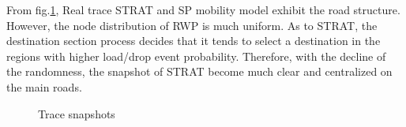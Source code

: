 From fig.\ref{figure_trace_snapshots}, Real trace STRAT and SP mobility model exhibit the road structure. However, the node distribution of RWP is much uniform.
As to STRAT, the destination section process decides that it tends to select a destination in the regions with higher load/drop event probability.
Therefore, with the decline of the randomness, the snapshot of STRAT become much clear and centralized on the main roads.
\begin{figure}[!h]
\centering
{}
\vspace{0.in}
\hspace{0.0in}
\vspace{0.in}
\hspace{0.0in}
\vspace{0.in}
\hspace{0.0in}
\caption{Trace snapshots}\label{figure_trace_snapshots}
\end{figure}



